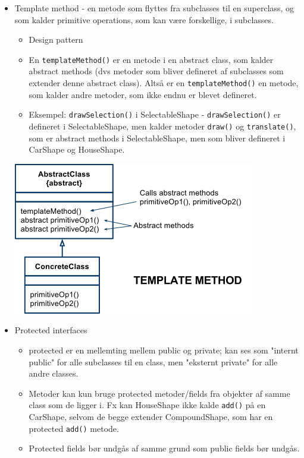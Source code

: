 \begin{itemize}
  \item Template method - en metode som flyttes fra subclasses til en superclass, og som kalder primitive operations, som kan være forskellige, i subclasses.
  \begin{itemize}
    \item Design pattern
    \item En \verb|templateMethod()| er en metode i en abstract class, som kalder abstract methods (dvs metoder som bliver defineret af subclasses som extender denne abstract class). Altså er en \verb|templateMethod()| en metode, som kalder andre metoder, som ikke endnu er blevet defineret.
    \item Eksempel: \verb|drawSelection()| i SelectableShape - \verb|drawSelection()| er defineret i SelectableShape, men kalder metoder \verb|draw()| og \verb|translate()|, som er abstract methods i SelectableShape, men som bliver defineret i CarShape og HouseShape.
  \end{itemize}

  \begin{center}
    \includegraphics[scale=0.7]{images/template_method_pattern.png}
  \end{center}

  \item Protected interfaces
  \begin{itemize}
    \item protected er en mellemting mellem public og private; kan ses som "internt public" for alle subclasses til en class, men "eksternt private" for alle andre classes.
    \item Metoder kan kun bruge protected metoder/fields fra objekter af samme class som de ligger i. Fx kan HouseShape ikke kalde \verb|add()| på en CarShape, selvom de begge extender CompoundShape, som har en protected \verb|add()| metode.
    \item Protected fields bør undgås af samme grund som public fields bør undgås.
  \end{itemize}
\end{itemize}

